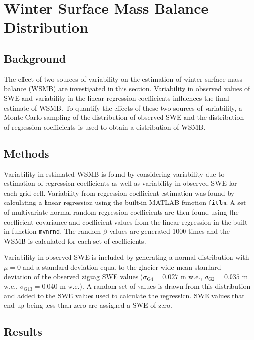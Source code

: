 \documentclass[12pt]{article}
\begin{document}
\section{Winter Surface Mass Balance Distribution}
\label{sec:WSMBdistribution}

\subsection{Background}

The effect of two sources of variability on the estimation of winter surface mass balance (WSMB) are investigated in this section. Variability in observed values of SWE and variability in the linear regression coefficients influences the final estimate of WSMB. To quantify the effects of these two sources of variability, a Monte Carlo sampling of the distribution of observed SWE and the distribution of regression coefficients is used to obtain a distribution of WSMB.  


\subsection{Methods}

Variability in estimated WSMB is found by considering variability due to estimation of regression coefficients as well as variability in observed SWE for each grid cell. Variability from regression coefficient estimation was found by calculating a linear regression using the built-in MATLAB function \texttt{fitlm}. A set of multivariate normal random regression coefficients are then found using the coefficient covariance and coefficient values from the linear regression in the built-in function \texttt{mvnrnd}. The random $\beta$ values are generated 1000 times and the WSMB is calculated for each set of coefficients.

Variability in observed SWE is included by generating a normal distribution with $\mu=0$ and a standard deviation equal to the glacier-wide mean standard deviation of the observed zigzag SWE values ($\sigma_{\mathrm{G4}} = 0.027 $ m w.e., $\sigma_{\mathrm{G2}} = 0.035$ m w.e., $\sigma_{\mathrm{G13}} = 0.040 $ m w.e.). A random set of values is drawn from this distribution and added to the SWE values used to calculate the regression. SWE values that end up being less than zero are assigned a SWE of zero.


\subsection{Results}
\end{document}
